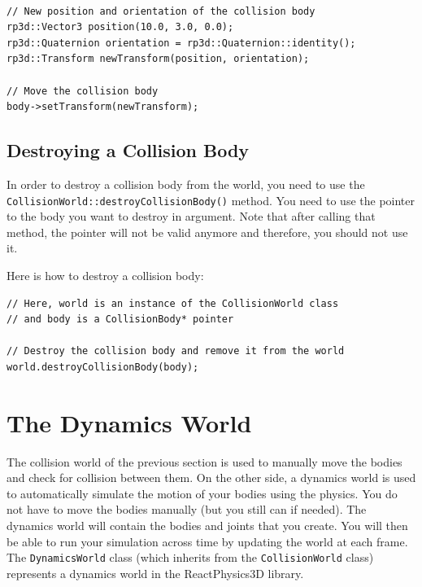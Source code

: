 \documentclass[a4paper,12pt]{article}
\begin{document}
     \begin{lstlisting}

// New position and orientation of the collision body
rp3d::Vector3 position(10.0, 3.0, 0.0);
rp3d::Quaternion orientation = rp3d::Quaternion::identity();
rp3d::Transform newTransform(position, orientation);

// Move the collision body
body->setTransform(newTransform);
  \end{lstlisting}

    \subsection{Destroying a Collision Body}

    \begin{sloppypar}
    In order to destroy a collision body from the world, you need to use the \texttt{CollisionWorld::destroyCollisionBody()} method. You need to use the pointer to the body you
    want to destroy in argument. Note that after calling that method, the pointer will not be valid anymore and therefore, you should not use it. \\
    \end{sloppypar}

    Here is how to destroy a collision body: \\

    \begin{lstlisting}
// Here, world is an instance of the CollisionWorld class
// and body is a CollisionBody* pointer

// Destroy the collision body and remove it from the world
world.destroyCollisionBody(body);
  \end{lstlisting}

    \section{The Dynamics World}
    \label{sec:dynamicsworld}

    The collision world of the previous section is used to manually move the bodies and check for collision between them. On the other side, a dynamics world
    is used to automatically simulate the motion of your bodies using the physics. You do not have to move the bodies manually (but you still can if needed).
    The dynamics world will contain the bodies and joints that you create. You will then be able to run your simulation across time by updating the world at each frame.
    The \texttt{DynamicsWorld} class (which inherits from the \texttt{CollisionWorld} class) represents a dynamics world in the ReactPhysics3D library.
\end{document}
